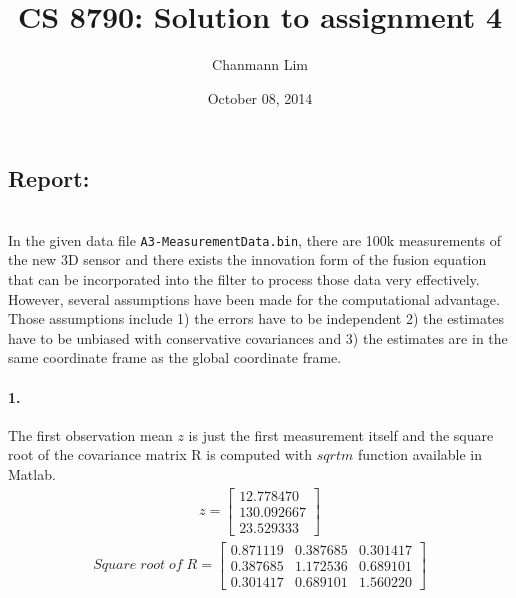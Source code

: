 \documentclass[a4paper]{article}
\begin{document}
\title{CS 8790: Solution to assignment 4}
\author{Chanmann Lim}
\date{October 08, 2014}
\maketitle

\subsection*{Report:} ~\\
\indent In the given data file \texttt{A3-MeasurementData.bin}, there are 100k measurements of the new 3D sensor and there exists the innovation form of the fusion equation that can be incorporated into the filter to process those data very effectively. However, several assumptions have been made for the computational advantage. Those assumptions include 1) the errors have to be independent 2) the estimates have to be unbiased with conservative covariances and 3) the estimates are in the same coordinate frame as the global coordinate frame.

\paragraph{1. } The first observation mean $z$ is just the first measurement itself and the square root of the covariance matrix R is computed with $sqrtm$ function available in Matlab.
\begin{align*}
z = \begin{bmatrix}
		12.778470 \\
		130.092667 \\
		23.529333
	\end{bmatrix}
\end{align*}
\begin{align*}
Square \; root \; of \; R = 
	\begin{bmatrix}
		0.871119    &   0.387685   &    0.301417 \\
     	0.387685    &   1.172536   &    0.689101 \\
      	0.301417    &   0.689101   &    1.560220
	\end{bmatrix}
\end{align*}
\end{document}
